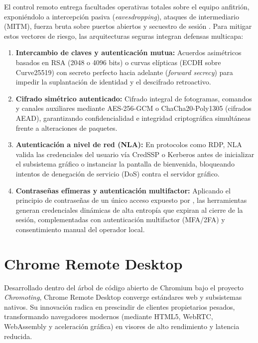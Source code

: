 \documentclass[12pt]{article}
\begin{document}
El control remoto entrega facultades operativas totales sobre el equipo anfitrión, exponiéndolo a intercepción pasiva (\textit{eavesdropping}), ataques de intermediario (MITM), fuerza bruta sobre puertos abiertos y secuestro de sesión \parencite[\S 15.1, p.\ 658]{stallings2018operating}. Para mitigar estos vectores de riesgo, las arquitecturas seguras integran defensas multicapa:
\begin{enumerate}[noitemsep, topsep=4pt]
    \item \textbf{Intercambio de claves y autenticación mutua:} Acuerdos asimétricos basados en RSA (2048 o 4096 bits) o curvas elípticas (ECDH sobre Curve25519) con secreto perfecto hacia adelante (\textit{forward secrecy}) para impedir la suplantación de identidad y el descifrado retroactivo.
    \item \textbf{Cifrado simétrico autenticado:} Cifrado integral de fotogramas, comandos y canales auxiliares mediante AES-256-GCM o ChaCha20-Poly1305 (cifrados AEAD), garantizando confidencialidad e integridad criptográfica simultáneas frente a alteraciones de paquetes.
    \item \textbf{Autenticación a nivel de red (NLA):} En protocolos como RDP, NLA valida las credenciales del usuario vía CredSSP o Kerberos antes de inicializar el subsistema gráfico o instanciar la pantalla de bienvenida, bloqueando intentos de denegación de servicio (DoS) contra el servidor gráfico.
    \item \textbf{Contraseñas efímeras y autenticación multifactor:} Aplicando el principio de contraseñas de un único acceso expuesto por \textcite[\S 9.7, p.\ 531]{carretero2001sistemas}, las herramientas generan credenciales dinámicas de alta entropía que expiran al cierre de la sesión, complementadas con autenticación multifactor (MFA/2FA) y consentimiento manual del operador local.
\end{enumerate}

\section{Chrome Remote Desktop}\label{sec:chromeRemoteDesktop}

Desarrollado dentro del árbol de código abierto de Chromium bajo el proyecto \textit{Chromoting}, Chrome Remote Desktop converge estándares web y subsistemas nativos. Su innovación radica en prescindir de clientes propietarios pesados, transformando navegadores modernos (mediante HTML5, WebRTC, WebAssembly y aceleración gráfica) en visores de alto rendimiento y latencia reducida.
\end{document}

